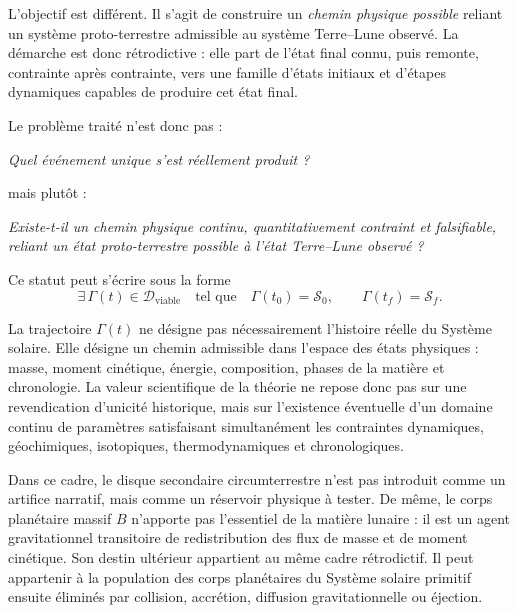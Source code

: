 \documentclass[11pt,a4paper,openany]{report}
\begin{document}
L'objectif est différent. Il s'agit de construire un \emph{chemin physique
possible} reliant un système proto-terrestre admissible au système Terre--Lune
observé. La démarche est donc rétrodictive : elle part de l'état final connu,
puis remonte, contrainte après contrainte, vers une famille d'états initiaux et
d'étapes dynamiques capables de produire cet état final.

Le problème traité n'est donc pas :

\begin{center}
\emph{Quel événement unique s'est réellement produit ?}
\end{center}

mais plutôt :

\begin{center}
\emph{Existe-t-il un chemin physique continu, quantitativement contraint et
falsifiable, reliant un état proto-terrestre possible à l'état Terre--Lune
observé ?}
\end{center}

Ce statut peut s'écrire sous la forme
\begin{equation}
\boxed{
\exists\,\Gamma(t)\in\mathcal{D}_{\mathrm{viable}}
\quad\text{tel que}\quad
\Gamma(t_0)=\mathcal{S}_0,\qquad
\Gamma(t_f)=\mathcal{S}_f .
}
\label{eq:statut-retrodictif}
\end{equation}

La trajectoire $\Gamma(t)$ ne désigne pas nécessairement l'histoire réelle du
Système solaire. Elle désigne un chemin admissible dans l'espace des états
physiques : masse, moment cinétique, énergie, composition, phases de la matière
et chronologie. La valeur scientifique de la théorie ne repose donc pas sur une
revendication d'unicité historique, mais sur l'existence éventuelle d'un domaine
continu de paramètres satisfaisant simultanément les contraintes dynamiques,
géochimiques, isotopiques, thermodynamiques et chronologiques.

Dans ce cadre, le disque secondaire circumterrestre n'est pas introduit comme
un artifice narratif, mais comme un réservoir physique à tester. De même, le
corps planétaire massif $B$ n'apporte pas l'essentiel de la matière
lunaire : il est un agent gravitationnel transitoire de redistribution des
flux de masse et de moment cinétique. Son destin ultérieur appartient au même
cadre rétrodictif. Il peut appartenir à la population des corps planétaires du
Système solaire primitif ensuite éliminés par collision, accrétion, diffusion
gravitationnelle ou éjection.
\end{document}
